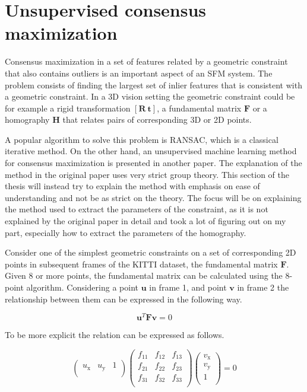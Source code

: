 \section{Unsupervised consensus maximization}

Consensus maximization in a set of features related by a geometric constraint that also contains outliers is an important aspect of an SFM system. The problem consists of finding the largest set of inlier features that is consistent with a geometric constraint. In a 3D vision setting the geometric constraint could be for example a rigid transformation $[\textbf{R}\ \textbf{t}]$, a fundamental matrix $\textbf{F}$ or a homography $\textbf{H}$ that relates pairs of corresponding 3D or 2D points.

A popular algorithm to solve this problem is RANSAC\cite{ransac}, which is a classical iterative method. On the other hand, an unsupervised machine learning method for consensus maximization is presented in another paper\cite{consensus}. The explanation of the method in the original paper uses very strict group theory. This section of the thesis will instead try to explain the method with emphasis on ease of understanding and not be as strict on the theory. The focus will be on explaining the method used to extract the parameters of the constraint, as it is not explained by the original paper in detail and took a lot of figuring out on my part, especially how to extract the parameters of the homography.

Consider one of the simplest geometric constraints on a set of corresponding 2D points in subsequent frames of the KITTI dataset, the fundamental matrix $\textbf{F}$. Given 8 or more points, the fundamental matrix can be calculated using the 8-point algorithm\cite{8-point}. Considering a point $\textbf{u}$ in frame 1, and point $\textbf{v}$ in frame 2 the relationship between them can be expressed in the following way.

 \begin{equation}
 \textbf{u}^T \textbf{F} \textbf{v} = 0
 \end{equation}
 
 To be more explicit the relation can be expressed as follows.
 
\begin{equation}
\begin{pmatrix}
u_\mathrm{x} & u_\mathrm{y} & 1 \\
\end{pmatrix}
\begin{pmatrix}
f_{11} & f_{12} & f_{13} \\
f_{21} & f_{22} & f_{23} \\
f_{31} & f_{32} & f_{33} \\
\end{pmatrix}
\begin{pmatrix}
v_\mathrm{x} \\
v_\mathrm{y} \\
1 \\
\end{pmatrix}
= 0
\end{equation}

